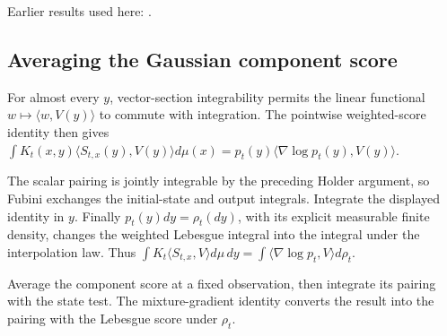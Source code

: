 \documentclass[11pt,a4paper]{report}
\begin{document}
Earlier results used here: \cite[Section~3.37.4]{LangevinLean2026ULASC}.
\subsection{\texorpdfstring{Averaging the Gaussian component score}{Averaging the Gaussian component score}}
\label{report-step-UnadjustedLangevin-LSI-GaussianScorePairing-lean-7}


For almost every \(y\), vector-section integrability permits the linear functional \(w\mapsto\langle w,V(y)\rangle\) to commute with integration. The pointwise weighted-score identity then gives \(\int K_t(x,y)\langle S_{t,x}(y),V(y)\rangle d\mu(x)=p_t(y)\langle\nabla\log p_t(y),V(y)\rangle\).



The scalar pairing is jointly integrable by the preceding Holder argument, so Fubini exchanges the initial-state and output integrals. Integrate the displayed identity in \(y\). Finally \(p_t(y)dy=\rho_t(dy)\), with its explicit measurable finite density, changes the weighted Lebesgue integral into the integral under the interpolation law. Thus \(\int K_t\langle S_{t,x},V\rangle d\mu\,dy=\int\langle\nabla\log p_t,V\rangle d\rho_t\).



Average the component score at a fixed observation, then integrate its pairing with the state test. The mixture-gradient identity converts the result into the pairing with the Lebesgue score under \(\rho_t\).
\end{document}
